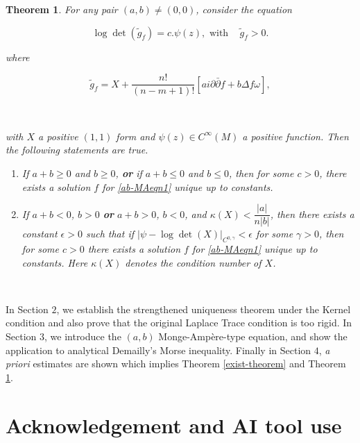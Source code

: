 \documentclass[11pt,letterpaper]{amsart}
\newcommand{\pbp}{\partial \bar{\partial}}
\newtheorem{theorem}{Theorem}[section]
\numberwithin{equation}{section}
\begin{document}
\begin{theorem} \label{ab-MAeqn-theorem}
For any pair $(a,b) \neq (0,0)$, consider the equation

\begin{equation}\label{ab-MAeqn1}
    \log\det(\tilde g_f) = c.\psi(z), \text{ with }\;\;\; \tilde g_f >0.
\end{equation}

\noindent where

$$\tilde g_f = X + \frac{n!}{(n-m+1)!} \left[ a i\pbp f + b \Delta f \omega\right],$$

\

\noindent with $X$ a positive $(1,1)$ form and $\psi(z) \in C^{\infty}(M)$ a positive function. Then the following statements are true.

\begin{enumerate}[label=\Roman*.]
    \item \label{a} If $a+b\geq 0$ and $b \geq 0$, \textbf{or} if $a+b \leq 0$ and $b \leq 0$, then for some $c>0$, there exists a solution $f$ for \eqref{ab-MAeqn1} unique up to constants.

    
    \item \label{b} If $a+b < 0$, $b > 0$ \textbf{or} $a+b >0$, $b < 0$, and $\kappa(X) < \dfrac{|a|}{n|b|}$, then there exists a constant $\epsilon>0$ such that if $|\psi - \log\det(X)|_{C^{0, \gamma}}< \epsilon$ for some $\gamma >0 $, then for some $c>0$ there exists a solution $f$ for \eqref{ab-MAeqn1} unique up to constants. Here $\kappa(X)$ denotes the condition number of $X$.
\end{enumerate}





\end{theorem}



\

In Section $2$, we establish the strengthened uniqueness theorem under the Kernel condition and also prove that the original Laplace Trace condition is too rigid. In Section $3$, we introduce the $(a,b)$ Monge-Amp\`ere-type equation, and show the application to analytical Demailly's Morse inequality. Finally in Section $4$, \emph{a priori} estimates are shown which implies Theorem \ref{exist-theorem} and Theorem \ref{ab-MAeqn-theorem}.


\section*{Acknowledgement and AI tool use}
\end{document}
